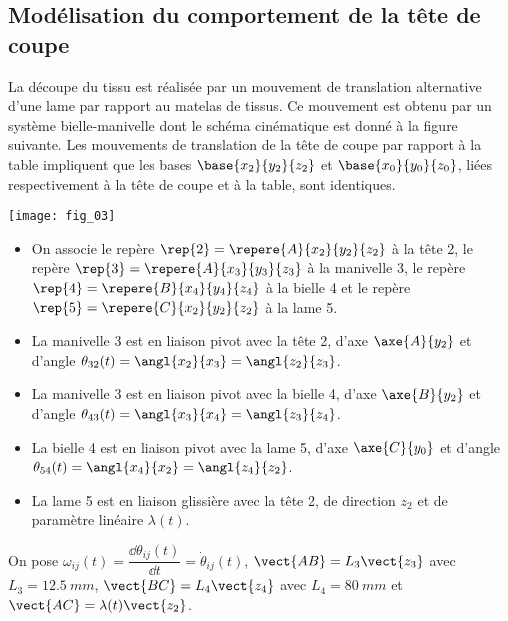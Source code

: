 \subsection*{Modélisation du comportement de la tête de coupe}

La découpe du tissu est réalisée par un mouvement de translation alternative d’une lame par rapport
au matelas de tissus. Ce mouvement est obtenu par un système bielle-manivelle dont le schéma cinématique
est donné à la figure suivante. Les mouvements de translation de la tête de coupe par rapport à la
table impliquent que les bases $\base{x_2}{y_2}{z_2}$ et $\base{x_0}{y_0}{z_0}$, liées respectivement à la tête de coupe et à la table, sont identiques.

\begin{marginfigure}
\texttt{[image: fig\_03]}
\end{marginfigure}

\begin{itemize} 
\item On associe le repère $\rep{2}=\repere{A}{x_2}{y_2}{z_2}$ à la tête 2, le repère $\rep{3}=\repere{A}{x_3}{y_3}{z_3}$ à la manivelle 3, le repère $\rep{4}=\repere{B}{x_4}{y_4}{z_4}$ à la bielle 4 et le repère $\rep{5}=\repere{C}{x_2}{y_2}{z_2}$ à la lame 5.
\item La manivelle 3 est en liaison pivot avec la tête 2, d'axe $\axe{A}{y_2}$ et d'angle $\theta_{32}(t)=\angl{x_2}{x_3}=\angl{z_2}{z_3}$.
\item La manivelle 3 est en liaison pivot avec la bielle 4, d'axe $\axe{B}{y_2}$ et d'angle $\theta_{43}(t)=\angl{x_3}{x_4}=\angl{z_3}{z_4}$.
\item La bielle 4 est en liaison pivot avec la lame 5, d'axe $\axe{C}{y_0}$ et d'angle $\theta_{54}(t)=\angl{x_4}{x_2}=\angl{z_4}{z_2}$.
\item La lame 5 est en liaison glissière avec la tête 2, de direction ${z_2}$ et de paramètre linéaire $\lambda(t)$.

\end{itemize}

On pose $\omega_{ij}(t)=\dfrac{\dd \theta_{ij}(t)}{\dd t} = \dot{\theta}_{ij}(t)$, $\vect{AB}=L_3\vect{z_3}$ avec $L_3=\SI{12,5}{mm}$, $\vect{BC}=L_4\vect{z_4}$ avec $L_4=\SI{80}{mm}$ et $\vect{AC}=\lambda(t)\vect{z_2}$.

\ifprof
\begin{corrige}
\end{corrige}
\else
\fi

